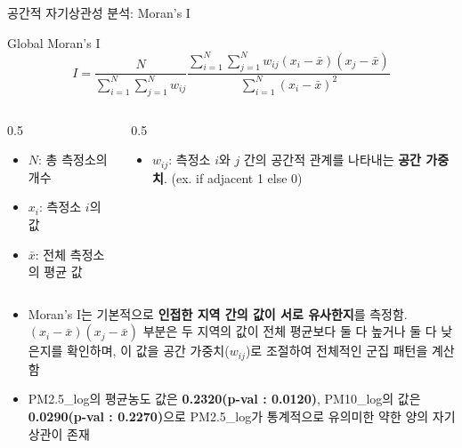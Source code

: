 \documentclass[serif, aspectratio=169]{beamer}
\begin{document}
\begin{frame}{공간적 자기상관성 분석: Moran's I}
    \begin{block}{\small Global Moran's I}
        $$
        I = \frac{N}{\sum_{i=1}^{N}\sum_{j=1}^{N} w_{ij}} \frac{\sum_{i=1}^{N}\sum_{j=1}^{N} w_{ij}(x_i - \bar{x})(x_j - \bar{x})}{\sum_{i=1}^{N}(x_i - \bar{x})^2}
        $$
    \end{block}
        
    \begin{columns}[T]
        \begin{column}{0.5\textwidth}
            \begin{itemize}\scriptsize
                \item $N$: 총 측정소의 개수
                \item $x_i$: 측정소 $i$의 값
                \item $\bar{x}$: 전체 측정소의 평균 값
            \end{itemize}
        \end{column}
        \begin{column}{0.5\textwidth}
            \begin{itemize}\scriptsize
                \item $w_{ij}$: 측정소 $i$와 $j$ 간의 공간적 관계를 나타내는 \textbf{공간 가중치}. (ex. if adjacent 1 else 0)
            \end{itemize}
        \end{column}
    \end{columns}
    
    \vspace{0.3cm}
    
    \begin{itemize}
        \item \scriptsize Moran's I는 기본적으로 \textbf{인접한 지역 간의 값이 서로 유사한지}를 측정함. $(x_i - \bar{x})(x_j - \bar{x})$ 부분은 두 지역의 값이 전체 평균보다 둘 다 높거나 둘 다 낮은지를 확인하며, 이 값을 공간 가중치($w_{ij}$)로 조절하여 전체적인 군집 패턴을 계산함
        \item PM2.5\_log의 평균농도 값은 \textbf{0.2320(p-val : 0.0120)}, PM10\_log의 값은 \textbf{0.0290(p-val : 0.2270)}으로 PM2.5\_log가 통계적으로 유의미한 약한 양의 자기상관이 존재
    \end{itemize}    
\end{frame}
\end{document}
